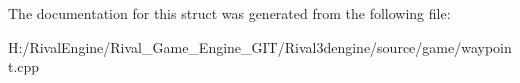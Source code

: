 The documentation for this struct was generated from the following file\+:\begin{DoxyCompactItemize}
\item 
H\+:/\+Rival\+Engine/\+Rival\+\_\+\+Game\+\_\+\+Engine\+\_\+\+G\+I\+T/\+Rival3dengine/source/game/waypoint.\+cpp\end{DoxyCompactItemize}
